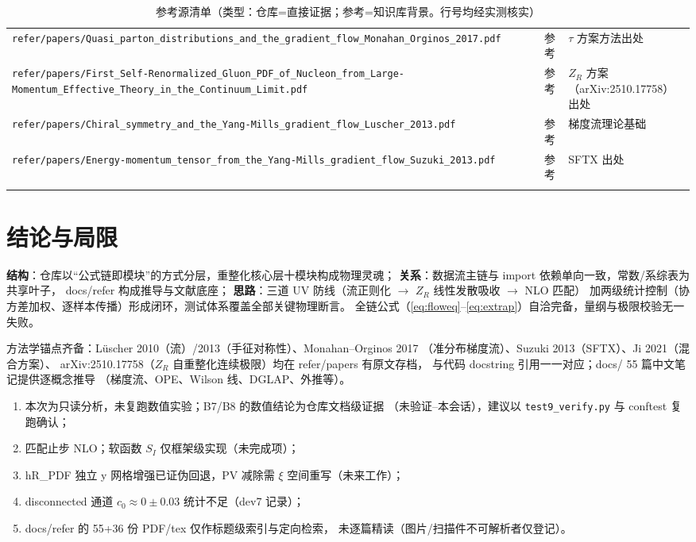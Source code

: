 \documentclass[UTF8]{ctexart}
\begin{document}
\begin{xltabular}{\textwidth}{XlX}
\texttt{\nolinkurl{refer/papers/Quasi_parton_distributions_and_the_gradient_flow_Monahan_Orginos_2017.pdf}} & 参考 & $\tau$ 方案方法出处 \\
\texttt{\nolinkurl{refer/papers/First_Self-Renormalized_Gluon_PDF_of_Nucleon_from_Large-Momentum_Effective_Theory_in_the_Continuum_Limit.pdf}} & 参考 & $Z_R$ 方案（arXiv:2510.17758）出处 \\
\texttt{\nolinkurl{refer/papers/Chiral_symmetry_and_the_Yang-Mills_gradient_flow_Luscher_2013.pdf}} & 参考 & 梯度流理论基础 \\
\texttt{\nolinkurl{refer/papers/Energy-momentum_tensor_from_the_Yang-Mills_gradient_flow_Suzuki_2013.pdf}} & 参考 & SFTX 出处 \\
\bottomrule
\caption{参考源清单（类型：仓库=直接证据；参考=知识库背景。行号均经实测核实）}
\end{xltabular}

\section{结论与局限}

\begin{conclbox}
\textbf{结构}：仓库以``公式链即模块''的方式分层，重整化核心层十模块构成物理灵魂；
\textbf{关系}：数据流主链与 import 依赖单向一致，常数/系综表为共享叶子，
docs/refer 构成推导与文献底座；
\textbf{思路}：三道 UV 防线（流正则化 $\to$ $Z_R$ 线性发散吸收 $\to$ NLO 匹配）
加两级统计控制（协方差加权、逐样本传播）形成闭环，测试体系覆盖全部关键物理断言。
全链公式（\ref{eq:floweq}--\ref{eq:extrap}）自洽完备，量纲与极限校验无一失败。
\end{conclbox}

\begin{refbox}
方法学锚点齐备：L\"uscher 2010（流）/2013（手征对称性）、Monahan--Orginos 2017
（准分布梯度流）、Suzuki 2013（SFTX）、Ji 2021（混合方案）、
arXiv:2510.17758（$Z_R$ 自重整化连续极限）均在 refer/papers 有原文存档，
与代码 docstring 引用一一对应；docs/ 55 篇中文笔记提供逐概念推导
（梯度流、OPE、Wilson 线、DGLAP、外推等）。
\end{refbox}

\begin{warnbox}
\begin{enumerate}
\item 本次为只读分析，未复跑数值实验；B7/B8 的数值结论为仓库文档级证据
（\textcolor{warn}{未验证--本会话}），建议以 \texttt{test9\_verify.py} 与
conftest 复跑确认；
\item 匹配止步 NLO；软函数 $S_I$ 仅框架级实现（\textcolor{warn}{未完成项}）；
\item hR\_PDF 独立 y 网格增强已证伪回退，PV 减除需 $\xi$ 空间重写（未来工作）；
\item disconnected 通道 $c_0\approx0\pm0.03$ 统计不足（dev7 记录）；
\item docs/refer 的 55+36 份 PDF/tex 仅作标题级索引与定向检索，
未逐篇精读（图片/扫描件不可解析者仅登记）。
\end{enumerate}
\end{warnbox}
\end{document}
